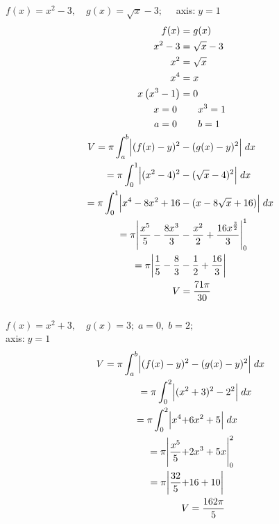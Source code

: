 \documentclass[12pt]{article}
\begin{document}
\begin{multicols}{2}
\begin{center}
\columnbreak
    $f(x)=x^2-3,\quad g(x)=\sqrt{x}-3;\quad$ axis:$\;y=1$
    \begin{align*}
        f(x) &= g(x) \\
        x^2-3&=\sqrt{x}-3 \\
        x^2&=\sqrt{x}\\
        x^4&=x\\
        x\left(x^3-1\right)&=0\\
        x=0\ &\qquad\! x^3=1 \\
        a=0\ &\qquad\! b=1 \\
        V=\pi\int^b_a\Bigl|(f(x)-y)^2 &-(g(x)-y)^2\Bigr|\;dx \\
        =\pi\int^1_0\Bigl|(x^2-4)^2 &-(\sqrt{x}-4)^2\Bigr|\;dx \\
        =\pi\int^1_0\Bigl|x^4-8x^2+16 &-(x-8\sqrt{x}+16)\Bigr|\;dx \\
        =\pi\Biggl|\frac{x^5}{5}-\frac{8x^3}{3} &- \frac{x^2}{2}+\frac{16x^{\frac{3}{2}}}{3}\Biggr|^1_0 \\
        =\pi\biggl|\frac{1}{5}-\frac{8}{3}&-\frac{1}{2}+\frac{16}{3}\biggr| \\
        V&=\frac{71\pi}{30} \\
    \end{align*} 
    \vspace{3pt}\\
    $f(x)=x^2+3,\quad g(x)=3;\;a=0,\;b=2;$\\
    \raggedleft axis:$\;y=1\quad$ 
    \begin{align*}
        V=\pi\int^b_a\Bigl|(f(x)-y)^2 &-(g(x)-y)^2\Bigr|\;dx \\
        =\pi\int^2_0\Bigl|(x^2&+3)^2 -2^2\Bigr|\;dx \\
        =\pi\int^2_0\Bigl|x^4+&6x^2+5\Bigr|\;dx \\
        =\pi\Biggl|\frac{x^5}{5}+&2x^3 + 5x\Biggr|^2_0 \\
        =\pi\biggl|\frac{32}{5}+&16+10\biggr| \\
        V&=\frac{162\pi}{5} \\ 
    \end{align*} 
\end{center}
\end{multicols}
\end{document}

